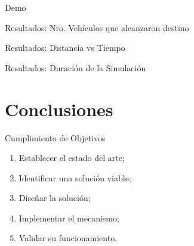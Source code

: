 \documentclass[aspectratio=169]{beamer}
\begin{document}
\begin{frame}[standout]
\centering
Demo
\end{frame}

\begin{frame}{Resultados: Nro. Vehículos que alcanzaron destino}
\begin{figure}
    \centering
    \renewcommand{\figurewidth}{\linewidth}
    \renewcommand{\figureheight}{200}
    
\end{figure}
\end{frame}

\begin{frame}{Resultados: Distancia vs Tiempo}
\begin{figure}
    \centering
    \renewcommand{\figurewidth}{\linewidth}
    \renewcommand{\figureheight}{165}
    
\end{figure}
\end{frame}

\begin{frame}{Resultados: Duración de la Simulación}
\begin{figure}
    \centering
    \renewcommand{\figurewidth}{\linewidth}
    \renewcommand{\figureheight}{165}
    
\end{figure}
\end{frame}

\section{Conclusiones}
\begin{frame}{Cumplimiento de Objetivos}
\centering
\begin{minipage}{.8\textwidth}
    \begin{enumerate}\pause
        \item Establecer el estado del arte;\hfill\checkmark\pause
        \item Identificar una solución viable;\hfill\checkmark\pause
        \item Diseñar la solución;\hfill\checkmark\pause
        \item Implementar el mecanismo;\hfill\checkmark\pause
        \item Validar su funcionamiento.\hfill\checkmark
    \end{enumerate}%
\end{minipage}
\end{frame}
\end{document}

